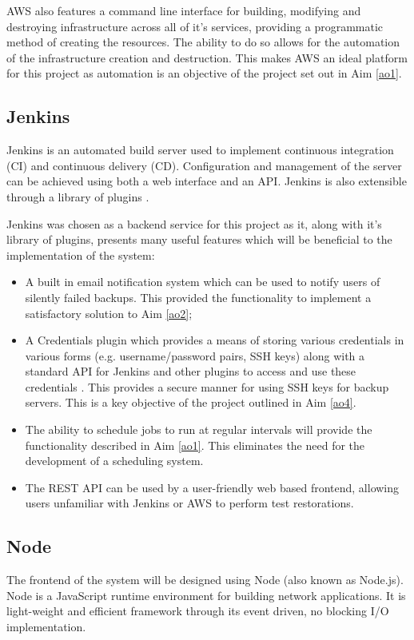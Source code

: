\label{aws-cli} AWS also features a command line interface for building, modifying and destroying infrastructure across all of it's services, providing a programmatic method of creating the resources. The ability to do so allows for the automation of the infrastructure creation and destruction. This makes AWS an ideal platform for this project as automation is an objective of the project set out in Aim \ref{ao1}. 


\subsection{Jenkins}
Jenkins is an automated build server used to implement continuous integration (CI) and continuous delivery (CD). Configuration and management of the server can be achieved using both a web interface and an API. Jenkins is also extensible through a library of plugins \citep{jenkins}.
 
Jenkins was chosen as a backend service for this project as it, along with it's library of plugins, presents many useful features which will be beneficial to the implementation of the system:
\begin{itemize}
	\item A built in email notification system which can be used to notify users of silently failed backups. This provided the functionality to implement a satisfactory solution to Aim \ref{ao2};
	\item \label{creds-plugin}A Credentials plugin which provides a means of storing various credentials in various forms (e.g. username/password pairs, SSH keys) along with a standard API for Jenkins and other plugins to access and use these credentials \citep{connolly}. This provides a secure manner for using SSH keys for backup servers. This is a key objective of the project outlined in Aim \ref{ao4}.
	\item The ability to schedule jobs to run at regular intervals will provide the functionality described in Aim \ref{ao1}. This eliminates the need for the development of a scheduling system. 
	\item The REST API can be used by a user-friendly web based frontend, allowing users unfamiliar with Jenkins or AWS to perform test restorations. 
\end{itemize}


\subsection{Node}
The frontend of the system will be designed using Node (also known as Node.js). Node is a JavaScript runtime environment for building network applications. It is light-weight and efficient framework through its event driven, no blocking I/O implementation. 

